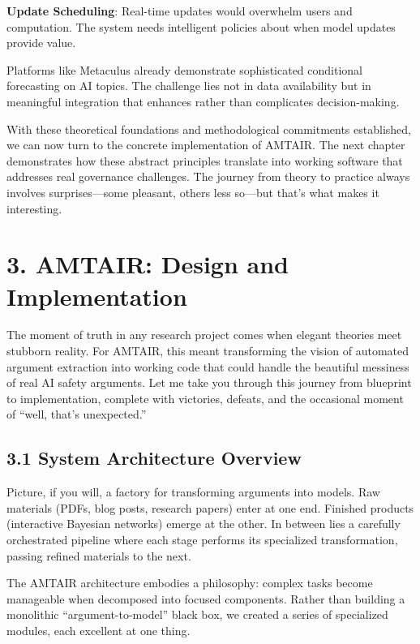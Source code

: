 \documentclass[
  11pt,
  letterpaper,
  openany]{book}
\begin{document}
\textbf{Update Scheduling}: Real-time updates would overwhelm users and
computation. The system needs intelligent policies about when model
updates provide value.

Platforms like Metaculus \textcite{tetlock2022} already demonstrate
sophisticated conditional forecasting on AI topics. The challenge lies
not in data availability but in meaningful integration that enhances
rather than complicates decision-making.

With these theoretical foundations and methodological commitments
established, we can now turn to the concrete implementation of AMTAIR.
The next chapter demonstrates how these abstract principles translate
into working software that addresses real governance challenges. The
journey from theory to practice always involves surprises---some
pleasant, others less so---but that's what makes it interesting.


\chapter{3. AMTAIR: Design and Implementation}\label{sec-amtair}

The moment of truth in any research project comes when elegant theories
meet stubborn reality. For AMTAIR, this meant transforming the vision of
automated argument extraction into working code that could handle the
beautiful messiness of real AI safety arguments. Let me take you through
this journey from blueprint to implementation, complete with victories,
defeats, and the occasional moment of ``well, that's unexpected.''

\section{3.1 System Architecture
Overview}\label{sec-system-architecture}

Picture, if you will, a factory for transforming arguments into models.
Raw materials (PDFs, blog posts, research papers) enter at one end.
Finished products (interactive Bayesian networks) emerge at the other.
In between lies a carefully orchestrated pipeline where each stage
performs its specialized transformation, passing refined materials to
the next.

The AMTAIR architecture embodies a philosophy: complex tasks become
manageable when decomposed into focused components. Rather than building
a monolithic ``argument-to-model'' black box, we created a series of
specialized modules, each excellent at one thing.
\end{document}
